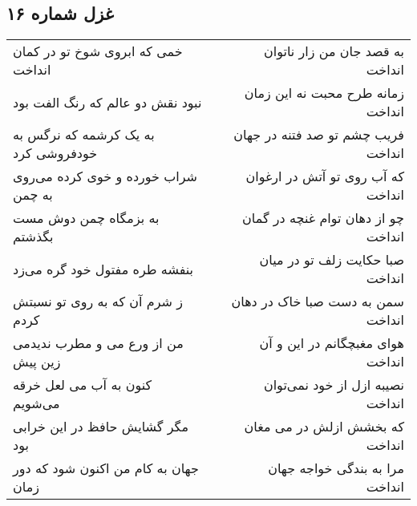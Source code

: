 \begin{center}
\section*{غزل شماره ۱۶}
\label{sec:sh016}
\begin{longtable}{l p{0.5cm} r}
خمی که ابروی شوخ تو در کمان انداخت
&&
به قصد جان من زار ناتوان انداخت
\\
نبود نقش دو عالم که رنگ الفت بود
&&
زمانه طرح محبت نه این زمان انداخت
\\
به یک کرشمه که نرگس به خودفروشی کرد
&&
فریب چشم تو صد فتنه در جهان انداخت
\\
شراب خورده و خوی کرده می‌روی به چمن
&&
که آب روی تو آتش در ارغوان انداخت
\\
به بزمگاه چمن دوش مست بگذشتم
&&
چو از دهان توام غنچه در گمان انداخت
\\
بنفشه طره مفتول خود گره می‌زد
&&
صبا حکایت زلف تو در میان انداخت
\\
ز شرم آن که به روی تو نسبتش کردم
&&
سمن به دست صبا خاک در دهان انداخت
\\
من از ورع می و مطرب ندیدمی زین پیش
&&
هوای مغبچگانم در این و آن انداخت
\\
کنون به آب می لعل خرقه می‌شویم
&&
نصیبه ازل از خود نمی‌توان انداخت
\\
مگر گشایش حافظ در این خرابی بود
&&
که بخشش ازلش در می مغان انداخت
\\
جهان به کام من اکنون شود که دور زمان
&&
مرا به بندگی خواجه جهان انداخت
\\
\end{longtable}
\end{center}
